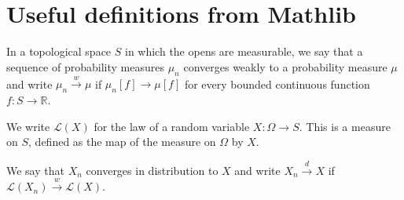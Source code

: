 \chapter{Useful definitions from Mathlib}


\begin{definition}\label{def:weak_cvg_measure}
 \leanok
In a topological space $S$ in which the opens are measurable, we say that a sequence of probability measures $\mu_n$ converges weakly to a probability measure $\mu$ and write $\mu_n \xrightarrow{w} \mu$ if $\mu_n[f] \to \mu[f]$ for every bounded continuous function $f : S \to \mathbb{R}$.
\end{definition}

We write $\mathcal L(X)$ for the law of a random variable $X : \Omega \to S$. This is a measure on $S$, defined as the map of the measure on $\Omega$ by $X$.

\begin{definition}\label{def:cvg_distribution}
We say that $X_n$ converges in distribution to $X$ and write $X_n \xrightarrow{d} X$ if $\mathcal L(X_n) \xrightarrow{w} \mathcal L(X)$.
\end{definition}